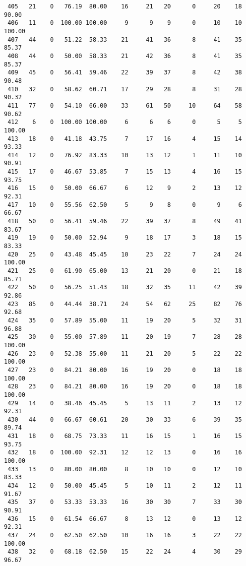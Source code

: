\begin{verbatim}
 405   21    0   76.19  80.00    16     21   20      0     20    18    90.00
 406   11    0  100.00 100.00     9      9    9      0     10    10   100.00
 407   44    0   51.22  58.33    21     41   36      8     41    35    85.37
 408   44    0   50.00  58.33    21     42   36      8     41    35    85.37
 409   45    0   56.41  59.46    22     39   37      8     42    38    90.48
 410   32    0   58.62  60.71    17     29   28      8     31    28    90.32
 411   77    0   54.10  66.00    33     61   50     10     64    58    90.62
 412    6    0  100.00 100.00     6      6    6      0      5     5   100.00
 413   18    0   41.18  43.75     7     17   16      4     15    14    93.33
 414   12    0   76.92  83.33    10     13   12      1     11    10    90.91
 415   17    0   46.67  53.85     7     15   13      4     16    15    93.75
 416   15    0   50.00  66.67     6     12    9      2     13    12    92.31
 417   10    0   55.56  62.50     5      9    8      0      9     6    66.67
 418   50    0   56.41  59.46    22     39   37      8     49    41    83.67
 419   19    0   50.00  52.94     9     18   17      3     18    15    83.33
 420   25    0   43.48  45.45    10     23   22      7     24    24   100.00
 421   25    0   61.90  65.00    13     21   20      0     21    18    85.71
 422   50    0   56.25  51.43    18     32   35     11     42    39    92.86
 423   85    0   44.44  38.71    24     54   62     25     82    76    92.68
 424   35    0   57.89  55.00    11     19   20      5     32    31    96.88
 425   30    0   55.00  57.89    11     20   19      7     28    28   100.00
 426   23    0   52.38  55.00    11     21   20      5     22    22   100.00
 427   23    0   84.21  80.00    16     19   20      0     18    18   100.00
 428   23    0   84.21  80.00    16     19   20      0     18    18   100.00
 429   14    0   38.46  45.45     5     13   11      2     13    12    92.31
 430   44    0   66.67  60.61    20     30   33      6     39    35    89.74
 431   18    0   68.75  73.33    11     16   15      1     16    15    93.75
 432   18    0  100.00  92.31    12     12   13      0     16    16   100.00
 433   13    0   80.00  80.00     8     10   10      0     12    10    83.33
 434   12    0   50.00  45.45     5     10   11      2     12    11    91.67
 435   37    0   53.33  53.33    16     30   30      7     33    30    90.91
 436   15    0   61.54  66.67     8     13   12      0     13    12    92.31
 437   24    0   62.50  62.50    10     16   16      3     22    22   100.00
 438   32    0   68.18  62.50    15     22   24      4     30    29    96.67

\end{verbatim}
